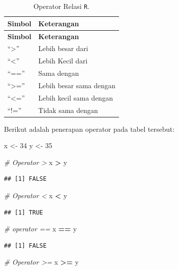 \documentclass[]{book}
\newenvironment{Shaded}{\begin{snugshade}}{\end{snugshade}}
\newcommand{\DecValTok}[1]{\textcolor[rgb]{0.00,0.00,0.81}{#1}}
\newcommand{\StringTok}[1]{\textcolor[rgb]{0.31,0.60,0.02}{#1}}
\newcommand{\CommentTok}[1]{\textcolor[rgb]{0.56,0.35,0.01}{\textit{#1}}}
\newcommand{\OperatorTok}[1]{\textcolor[rgb]{0.81,0.36,0.00}{\textbf{#1}}}
\newcommand{\NormalTok}[1]{#1}
\begin{document}
\begin{longtable}[]{@{}ll@{}}
\caption{\label{tab:oprelasi} Operator Relasi \texttt{R}.}\tabularnewline
\toprule
\textbf{Simbol} & \textbf{Keterangan}\tabularnewline
\midrule
\endfirsthead
\toprule
\textbf{Simbol} & \textbf{Keterangan}\tabularnewline
\midrule
\endhead
``\textgreater{}'' & Lebih besar dari\tabularnewline
``\textless{}'' & Lebih Kecil dari\tabularnewline
``=='' & Sama dengan\tabularnewline
``\textgreater{}='' & Lebih besar sama dengan\tabularnewline
``\textless{}='' & Lebih kecil sama dengan\tabularnewline
``!='' & Tidak sama dengan\tabularnewline
\bottomrule
\end{longtable}

Berikut adalah penerapan operator pada tabel tersebut:

\begin{Shaded}
\begin{Highlighting}[]
\NormalTok{x <-}\StringTok{ }\DecValTok{34}
\NormalTok{y <-}\StringTok{ }\DecValTok{35}

\CommentTok{# Operator >}
\NormalTok{x }\OperatorTok{>}\StringTok{ }\NormalTok{y}
\end{Highlighting}
\end{Shaded}

\begin{verbatim}
## [1] FALSE
\end{verbatim}

\begin{Shaded}
\begin{Highlighting}[]
\CommentTok{# Operator <}
\NormalTok{x }\OperatorTok{<}\StringTok{ }\NormalTok{y}
\end{Highlighting}
\end{Shaded}

\begin{verbatim}
## [1] TRUE
\end{verbatim}

\begin{Shaded}
\begin{Highlighting}[]
\CommentTok{# operator ==}
\NormalTok{x }\OperatorTok{==}\StringTok{ }\NormalTok{y}
\end{Highlighting}
\end{Shaded}

\begin{verbatim}
## [1] FALSE
\end{verbatim}

\begin{Shaded}
\begin{Highlighting}[]
\CommentTok{# Operator >=}
\NormalTok{x }\OperatorTok{>=}\StringTok{ }\NormalTok{y}
\end{Highlighting}
\end{Shaded}
\end{document}
